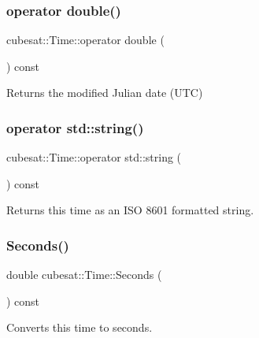 \subsubsection{\texorpdfstring{operator double()}{operator double()}}
{\footnotesize\ttfamily cubesat\+::\+Time\+::operator double (\begin{DoxyParamCaption}{ }\end{DoxyParamCaption}) const\hspace{0.3cm}{\ttfamily [inline]}}



Returns the modified Julian date (U\+TC) 

\mbox{\label{classcubesat_1_1Time_aff75f18fae255dac06e7be38e01253b3}} 
\subsubsection{\texorpdfstring{operator std\+::string()}{operator std::string()}}
{\footnotesize\ttfamily cubesat\+::\+Time\+::operator std\+::string (\begin{DoxyParamCaption}{ }\end{DoxyParamCaption}) const\hspace{0.3cm}{\ttfamily [inline]}}



Returns this time as an I\+SO 8601 formatted string. 

\mbox{\label{classcubesat_1_1Time_ad54d680f9f2321e766179135bf3ce31a}} 
\subsubsection{\texorpdfstring{Seconds()}{Seconds()}}
{\footnotesize\ttfamily double cubesat\+::\+Time\+::\+Seconds (\begin{DoxyParamCaption}{ }\end{DoxyParamCaption}) const\hspace{0.3cm}{\ttfamily [inline]}}



Converts this time to seconds. 

